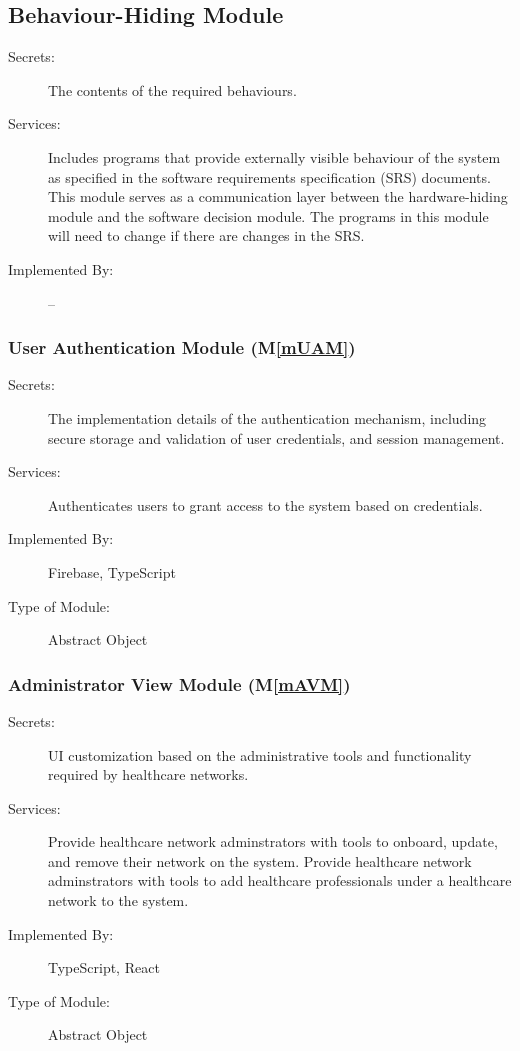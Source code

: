\documentclass[12pt, titlepage]{article}
\newcommand{\mref}[1]{M\ref{#1}}
\begin{document}
\subsection{Behaviour-Hiding Module}

\begin{description}
\item[Secrets:]The contents of the required behaviours.
\item[Services:]Includes programs that provide externally visible behaviour of the system as specified in the software requirements specification (SRS) documents. This module serves as a communication layer between the hardware-hiding module and the software decision module. The programs in this module will need to change if there are changes in the SRS.
\item[Implemented By:] --
\end{description}

\subsubsection{User Authentication Module (\mref{mUAM})} 

\begin{description}
\item[Secrets:]The implementation details of the authentication mechanism, including secure storage and validation of user credentials, and session management.
\item[Services:]Authenticates users to grant access to the system based on credentials.
\item[Implemented By:]Firebase, TypeScript
\item[Type of Module:]Abstract Object
\end{description}

\subsubsection{Administrator View Module (\mref{mAVM})}

\begin{description}
\item[Secrets:]UI customization based on the administrative tools and functionality required by healthcare networks.
\item[Services:]Provide healthcare network adminstrators with tools to onboard, update, and remove their network on the system. Provide healthcare network adminstrators with tools to add healthcare professionals under a healthcare network to the system.
\item[Implemented By:]TypeScript, React
\item[Type of Module:]Abstract Object
\end{description}
\end{document}
